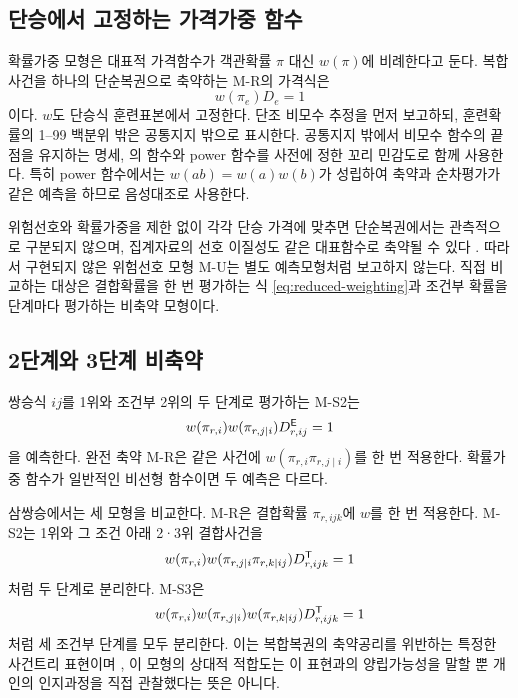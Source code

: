 \subsection{단승에서 고정하는 가격가중 함수}

확률가중 모형은 대표적 가격함수가 객관확률 $\pi$ 대신 $w(\pi)$에 비례한다고
둔다. 복합사건을 하나의 단순복권으로 축약하는 M-R의 가격식은
\begin{equation}
  w(\pi_e)D_e=1
  \label{eq:reduced-weighting}
\end{equation}
이다. $w$도 단승식 훈련표본에서 고정한다. 단조 비모수 추정을 먼저 보고하되,
훈련확률의 1--99 백분위 밖은 공통지지 밖으로 표시한다. 공통지지 밖에서
비모수 함수의 끝점을 유지하는 명세, \citet{prelec1998}의 함수와 power 함수를
사전에 정한 꼬리 민감도로 함께 사용한다. 특히 power 함수에서는
$w(ab)=w(a)w(b)$가 성립하여 축약과 순차평가가 같은 예측을 하므로 음성대조로
사용한다.

위험선호와 확률가중을 제한 없이 각각 단승 가격에 맞추면 단순복권에서는
관측적으로 구분되지 않으며, 집계자료의 선호 이질성도 같은 대표함수로 축약될
수 있다 \citep{snowbergwolfers2010,chiapporietal2019}. 따라서 구현되지 않은
위험선호 모형 M-U는 별도 예측모형처럼 보고하지 않는다. 직접 비교하는 대상은
결합확률을 한 번 평가하는 식 \eqref{eq:reduced-weighting}과 조건부 확률을
단계마다 평가하는 비축약 모형이다.

\subsection{2단계와 3단계 비축약}

쌍승식 $ij$를 1위와 조건부 2위의 두 단계로 평가하는 M-S2는
\begin{equation}
  w(\pi_{r,i})w(\pi_{r,j\mid i})D^{\mathsf{E}}_{r,ij}=1
  \label{eq:sequential-exacta}
\end{equation}
을 예측한다. 완전 축약 M-R은 같은 사건에
$w(\pi_{r,i}\pi_{r,j\mid i})$를 한 번 적용한다. 확률가중 함수가 일반적인
비선형 함수이면 두 예측은 다르다.

삼쌍승에서는 세 모형을 비교한다. M-R은 결합확률 $\pi_{r,ijk}$에 $w$를 한 번
적용한다. M-S2는 1위와 그 조건 아래 2·3위 결합사건을
\begin{equation}
  w(\pi_{r,i})w(\pi_{r,j\mid i}\pi_{r,k\mid ij})
  D^{\mathsf{T}}_{r,ijk}=1
  \label{eq:sequential-trifecta-two-stage}
\end{equation}
처럼 두 단계로 분리한다. M-S3은
\begin{equation}
  w(\pi_{r,i})w(\pi_{r,j\mid i})w(\pi_{r,k\mid ij})
  D^{\mathsf{T}}_{r,ijk}=1
  \label{eq:sequential-trifecta}
\end{equation}
처럼 세 조건부 단계를 모두 분리한다. 이는 복합복권의 축약공리를 위반하는
특정한 사건트리 표현이며 \citep{segal1990}, 이 모형의 상대적 적합도는 이
표현과의 양립가능성을 말할 뿐 개인의 인지과정을 직접 관찰했다는 뜻은 아니다.

